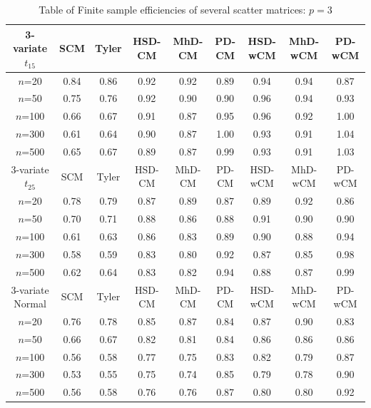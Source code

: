 \documentclass[fleqn,12pt]{article}
\begin{document}
\begin{table}
\begin{footnotesize}
\begin{tabular}{c|cc|ccc|ccc}
    3-variate $t_{15}$ & SCM  & Tyler & HSD-CM & MhD-CM & PD-CM & HSD-wCM & MhD-wCM & PD-wCM \\ \hline
    $n$=20             & 0.84 & 0.86  & 0.92   & 0.92   & 0.89  & 0.94    & 0.94    & 0.87   \\
    $n$=50             & 0.75 & 0.76  & 0.92   & 0.90   & 0.90  & 0.96    & 0.94    & 0.93   \\
    $n$=100            & 0.66 & 0.67  & 0.91   & 0.87   & 0.95  & 0.96    & 0.92    & 1.00   \\
    $n$=300            & 0.61 & 0.64  & 0.90   & 0.87   & 1.00  & 0.93    & 0.91    & 1.04   \\
    $n$=500            & 0.65 & 0.67  & 0.89   & 0.87   & 0.99  & 0.93    & 0.91    & 1.03   \\ \hline
    3-variate $t_{25}$ & SCM  & Tyler & HSD-CM & MhD-CM & PD-CM & HSD-wCM & MhD-wCM & PD-wCM \\ \hline
    $n$=20             & 0.78 & 0.79  & 0.87   & 0.89   & 0.87  & 0.89    & 0.92    & 0.86   \\
    $n$=50             & 0.70 & 0.71  & 0.88   & 0.86   & 0.88  & 0.91    & 0.90    & 0.90   \\
    $n$=100            & 0.61 & 0.63  & 0.86   & 0.83   & 0.89  & 0.90    & 0.88    & 0.94   \\
    $n$=300            & 0.58 & 0.59  & 0.83   & 0.80   & 0.92  & 0.87    & 0.85    & 0.98   \\
    $n$=500            & 0.62 & 0.64  & 0.83   & 0.82   & 0.94  & 0.88    & 0.87    & 0.99   \\ \hline
    3-variate Normal   & SCM  & Tyler & HSD-CM & MhD-CM & PD-CM & HSD-wCM & MhD-wCM & PD-wCM \\ \hline
    $n$=20             & 0.76 & 0.78  & 0.85   & 0.87   & 0.84  & 0.87    & 0.90    & 0.83   \\
    $n$=50             & 0.66 & 0.67  & 0.82   & 0.81   & 0.84  & 0.86    & 0.86    & 0.86   \\
    $n$=100            & 0.56 & 0.58  & 0.77   & 0.75   & 0.83  & 0.82    & 0.79    & 0.87   \\
    $n$=300            & 0.53 & 0.55  & 0.75   & 0.74   & 0.85  & 0.79    & 0.78    & 0.90   \\
    $n$=500            & 0.56 & 0.58  & 0.76   & 0.76   & 0.87  & 0.80    & 0.80    & 0.92   \\ \hline
    \end{tabular}
\end{footnotesize}
\caption{Table of Finite sample efficiencies of several scatter matrices: $p=3$}
\label{table:FSEtable3}
\end{table}
\end{document}
